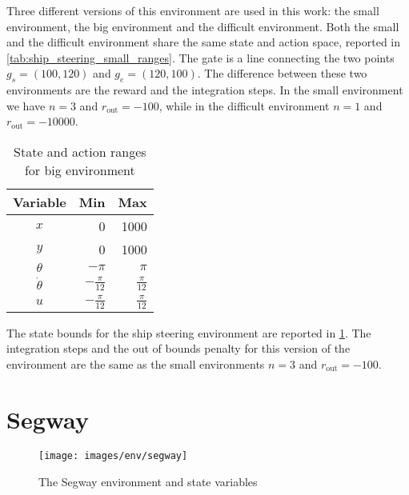 Three different versions of this environment are used in this work: the small environment, the big environment and the difficult environment.
Both the small and the difficult environment share the same state and action space, reported in \cref{tab:ship_steering_small_ranges}. The gate is a line connecting the two points $g_s=(100, 120)$ and $g_e=(120, 100)$.
The difference between these two environments are the reward and the integration steps. In the small environment we have $n=3$ and $r_{\text{out}}=-100$, while in the difficult environment $n=1$ and  $r_{\text{out}}=-10000$.

\begin{table}[t]
	\centering
	\begin{tabular}{c r r}
		\toprule
		Variable & Min & Max \\
		\midrule
		$x$ & 0 & 1000 \\ 
		$y$ & 0 & 1000 \\
		$\theta$ & $-\pi$ & $\pi$ \\
		$\dot{\theta}$ & $-\frac{\pi}{12}$ & $\frac{\pi}{12}$ \\
		$u$ & $-\frac{\pi}{12}$ & $\frac{\pi}{12}$ \\
		\bottomrule
	\end{tabular}
	\caption{State and action ranges for big environment}
	\label{tab:ship_steering_big_ranges}
\end{table}
The state bounds for the ship steering environment are reported in \cref{tab:ship_steering_big_ranges}. The integration steps and the out of bounds penalty for this version of the environment are the same as  the small environments \ie $n=3$ and $r_{\text{out}}=-100$.
\section{Segway}
\label{a:segway_description}
\begin{figure}[b]
	\centering
	\texttt{[image: images/env/segway]}
	\label{fig:segway_vars}
	\caption{The Segway environment and state variables}
\end{figure}

